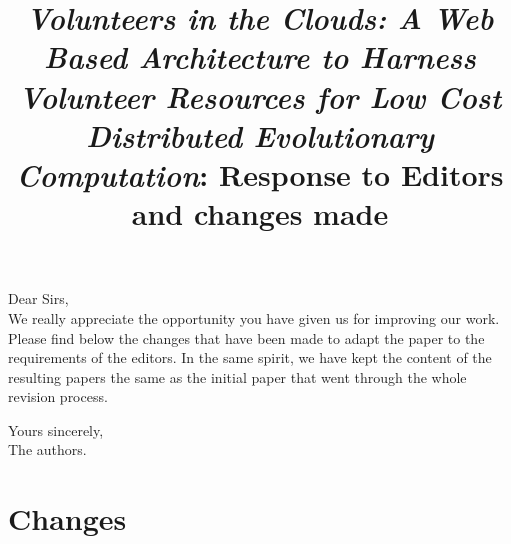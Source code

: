 \documentclass[preprint]{elsarticle}
\begin{document}

\title{{\em Volunteers in the Clouds: A Web Based Architecture to Harness Volunteer Resources 
for Low Cost Distributed Evolutionary Computation}: Response to
Editors and changes made}

\noindent
Dear Sirs,\\

We really appreciate the opportunity you have given us for improving
our work. Please find below the changes that have been made to adapt
the paper to the requirements of the editors. In the same spirit, we
have kept the content of the resulting papers the same as the initial
paper that went through the whole revision process. 

\noindent
Yours sincerely,\\
The authors.

\section*{Changes}
\end{document}
